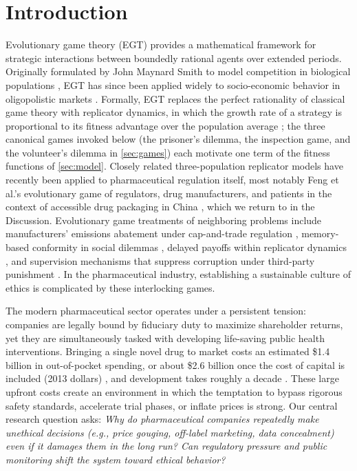 \documentclass[10pt]{article}
\begin{document}
\section{Introduction}
Evolutionary game theory (EGT) provides a mathematical framework for strategic interactions between boundedly rational agents over extended periods. Originally formulated by John Maynard Smith to model competition in biological populations \cite{smith1982}, EGT has since been applied widely to socio-economic behavior in oligopolistic markets \cite{weibull1995}. Formally, EGT replaces the perfect rationality of classical game theory with replicator dynamics, in which the growth rate of a strategy is proportional to its fitness advantage over the population average \cite{taylor1978}; the three canonical games invoked below (the prisoner's dilemma, the inspection game, and the volunteer's dilemma in \cref{sec:games}) each motivate one term of the fitness functions of \cref{sec:model}. Closely related three-population replicator models have recently been applied to pharmaceutical regulation itself, most notably Feng et al.'s evolutionary game of regulators, drug manufacturers, and patients in the context of accessible drug packaging in China \cite{feng2024}, which we return to in the Discussion.
Evolutionary game treatments of neighboring problems include
manufacturers' emissions abatement under cap-and-trade regulation \cite{zhang2019evolutionary},
memory-based conformity in social dilemmas \cite{shu2019memory},
delayed payoffs within replicator dynamics \cite{wettergren2021replicator},
and
supervision mechanisms that suppress corruption under third-party punishment \cite{shi2023bidirectional}.
In the pharmaceutical industry, establishing a sustainable culture of ethics is complicated by these interlocking games.

The modern pharmaceutical sector operates under a persistent tension: companies are legally bound by fiduciary duty to maximize shareholder returns, yet they are simultaneously tasked with developing life-saving public health interventions. Bringing a single novel drug to market costs an estimated \$1.4 billion in out-of-pocket spending, or about \$2.6 billion once the cost of capital is included (2013 dollars) \cite{dimasi2016}, and development takes roughly a decade \cite{cbo2021}. These large upfront costs create an environment in which the temptation to bypass rigorous safety standards, accelerate trial phases, or inflate prices is strong. Our central research question asks: \textit{Why do pharmaceutical companies repeatedly make unethical decisions (e.g., price gouging, off-label marketing, data concealment) even if it damages them in the long run? Can regulatory pressure and public monitoring shift the system toward ethical behavior?}
\end{document}
